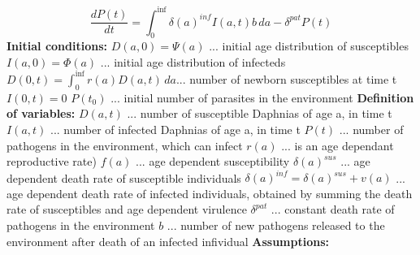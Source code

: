 \documentclass[10pt]{article}         %
\begin{document}
\begin{equation}
\label{P_eq}
	\frac{dP(t)}{dt}= \int_{0}^{\inf} \delta(a)^{inf} I(a,t)b \, da - \delta^{pat}P(t)
\end{equation} \newline
\newline
\textbf{Initial conditions:}  \newline
$D(a,0)=\Psi(a)$ ... initial age distribution of susceptibles \newline
$I(a,0)=\Phi(a)$ ... initial age distribution of infecteds \newline
$D(0,t)= \int_0^{\inf}r(a)D(a,t)\, da$... number of newborn susceptibles at time t\newline
$I(0,t)=0$\newline
$P(t_0)$ ... initial number of parasites in the environment \newline\newline
\textbf{Definition of variables:}  \newline
$D(a,t)$ 	...		number of susceptible Daphnias of age a, in time t	\newline
$I(a,t)$ 	...		number of infected Daphnias of age a, in time t \newline
$P(t)$	...		number of pathogens in the environment, which can infect \newline
$r(a)$ ... is an age dependant reproductive rate)\newline
$f(a)$ ... age dependent susceptibility \newline
$\delta(a)^{sus}$ ... age dependent death rate of susceptible individuals \newline\newline
$\delta(a)^{inf} = \delta(a)^{sus} + v(a)$ ... age dependent death rate of infected individuals, obtained by summing the death rate of susceptibles and age dependent virulence \newline
$\delta^{pat}$ ... constant death rate of pathogens in the environment \newline
$b$ ... number of new pathogens released to the environment after death of an infected infividual\newline
\newline
\textbf{Assumptions:}
\end{document}
